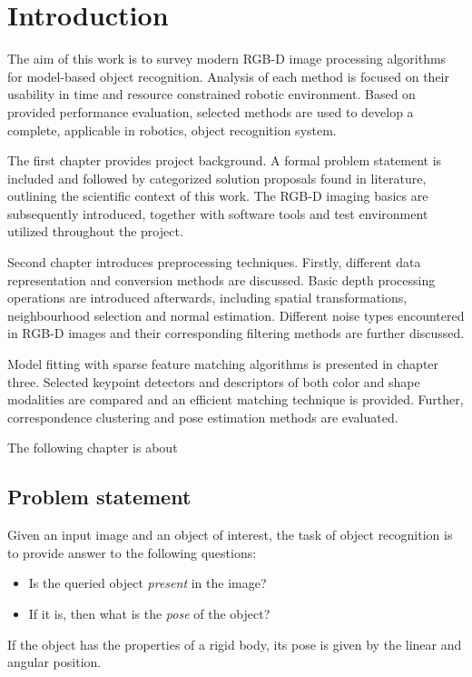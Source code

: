 \chapter{Introduction}
\label{cha:introduction}

The aim of this work is to survey modern RGB-D image processing algorithms for model-based object recognition. Analysis of each method is focused on their usability in time and resource constrained robotic environment. Based on provided performance evaluation, selected methods are used to develop a complete, applicable in robotics, object recognition system.

The first chapter provides project background. A formal problem statement is included and followed by categorized solution proposals found in literature, outlining the scientific context of this work. The RGB-D imaging basics are subsequently introduced, together with software tools and test environment utilized throughout the project.

Second chapter introduces preprocessing techniques. Firstly, different data representation and conversion methods are discussed. Basic depth processing operations are introduced afterwards, including spatial transformations, neighbourhood selection and normal estimation. Different noise types encountered in RGB-D images and their corresponding filtering methods are further discussed.

Model fitting with sparse feature matching algorithms is presented in chapter three. Selected keypoint detectors and descriptors of both color and shape modalities are compared and an efficient matching technique is provided. Further, correspondence clustering and pose estimation methods are evaluated.

The following chapter is about 


\section{Problem statement}
\label{sec:problem}

Given an input image and an object of interest, the task of object recognition is to provide answer to the following questions:
\begin{itemize}
\item Is the queried object \textit{present} in the image?
\item If it is, then what is the \textit{pose} of the object?
\end{itemize}
If the object has the properties of a rigid body, its pose is given by the linear and angular position.


